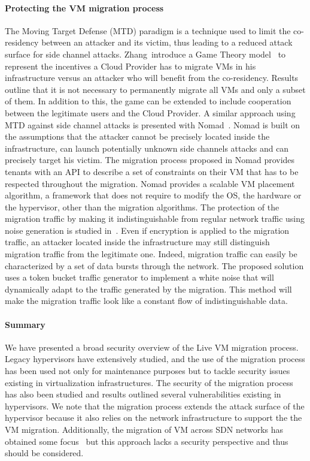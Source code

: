 \paragraph{Protecting the VM migration process}
The Moving Target Defense (MTD) paradigm is a technique used to limit the co-residency between an attacker and its victim, thus leading to a reduced attack surface for side channel attacks.
Zhang~\etal introduce a Game Theory model~\cite{incentivemtd-Zhang2012} to represent the incentives a Cloud Provider has to migrate VMs in his infrastructure versus an attacker who will benefit from the co-residency. Results outline that it is not necessary to permanently migrate all VMs and only a subset of them. In addition to this, the game can be extended to include cooperation between the legitimate users and the Cloud Provider.
A similar approach using MTD against side channel attacks is presented with Nomad~\cite{nomad-Moon2015b}. Nomad is built on the assumptions that the attacker cannot be precisely located inside the infrastructure, can launch potentially unknown side channels attacks and can precisely target his victim. 
The migration process proposed in Nomad provides tenants with an API to describe a set of constraints on their VM that has to be respected throughout the migration.
Nomad provides a scalable VM placement algorithm, a framework that does not require to modify the OS, the hardware or the hypervisor, other than the migration algorithms.
The protection of the migration traffic by making it indistinguishable from regular network traffic using noise generation is studied in~\cite{stealth-Achleitner2017a}. Even if encryption is applied to the migration traffic, an attacker located inside the infrastructure may still distinguish migration traffic from the legitimate one. Indeed, migration traffic can easily be characterized by a set of data bursts through the network. The proposed solution uses a token bucket traffic generator to implement a white noise that will dynamically adapt to the traffic generated by the migration. This method will make the migration traffic look like a constant flow of indistinguishable data.

\paragraph{Summary}
We have presented a broad security overview of the Live VM migration process.
Legacy hypervisors have extensively studied, and the use of the migration process has been used not only for maintenance purposes but to tackle security issues existing in virtualization infrastructures.
The security of the migration process has also been studied and results outlined several vulnerabilities existing in hypervisors.
We note that the migration process extends the attack surface of the hypervisor because it also relies on the network infrastructure to support the the VM migration.
Additionally, the migration of VM across SDN networks has obtained some focus~\cite{Datacenters2014,Lin2013,Ibn-Khedher2015} but this approach lacks a security perspective and thus should be considered.
